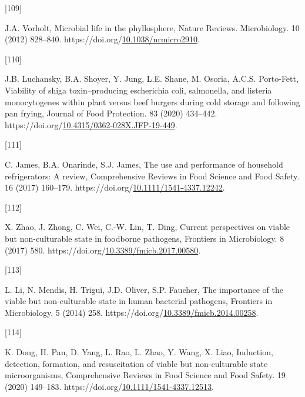 \documentclass[preprint,3p,
a4paper]{elsarticle} %
\newlength{\cslhangindent}
\newlength{\csllabelwidth}
\newlength{\cslentryspacingunit} %
\newenvironment{CSLReferences}[2] %
 {%
  \setlength{\parindent}{0pt}
  \ifodd #1
  \let\oldpar\par
  \def\par{\hangindent=\cslhangindent\oldpar}
  \fi
  \setlength{\parskip}{#2\cslentryspacingunit}
 }%
 {}
\newcommand{\CSLLeftMargin}[1]{\parbox[t]{\csllabelwidth}{#1}}
\newcommand{\CSLRightInline}[1]{\parbox[t]{\linewidth - \csllabelwidth}{#1}\break}
\begin{document}
\begin{CSLReferences}{0}{0}
\leavevmode{}%
\CSLLeftMargin{{[}109{]} }%
\CSLRightInline{J.A. Vorholt, Microbial life in the phyllosphere, Nature
Reviews. Microbiology. 10 (2012) 828--840.
https://doi.org/\href{https://doi.org/10.1038/nrmicro2910}{10.1038/nrmicro2910}.}

\leavevmode{}%
\CSLLeftMargin{{[}110{]} }%
\CSLRightInline{J.B. Luchansky, B.A. Shoyer, Y. Jung, L.E. Shane, M.
Osoria, A.C.S. Porto-Fett, Viability of shiga toxin--producing
escherichia coli, salmonella, and listeria monocytogenes within plant
versus beef burgers during cold storage and following pan frying,
Journal of Food Protection. 83 (2020) 434--442.
https://doi.org/\href{https://doi.org/10.4315/0362-028X.JFP-19-449}{10.4315/0362-028X.JFP-19-449}.}

\leavevmode{}%
\CSLLeftMargin{{[}111{]} }%
\CSLRightInline{C. James, B.A. Onarinde, S.J. James, The use and
performance of household refrigerators: A review, Comprehensive Reviews
in Food Science and Food Safety. 16 (2017) 160--179.
https://doi.org/\href{https://doi.org/10.1111/1541-4337.12242}{10.1111/1541-4337.12242}.}

\leavevmode{}%
\CSLLeftMargin{{[}112{]} }%
\CSLRightInline{X. Zhao, J. Zhong, C. Wei, C.-W. Lin, T. Ding, Current
perspectives on viable but non-culturable state in foodborne pathogens,
Frontiers in Microbiology. 8 (2017) 580.
https://doi.org/\href{https://doi.org/10.3389/fmicb.2017.00580}{10.3389/fmicb.2017.00580}.}

\leavevmode{}%
\CSLLeftMargin{{[}113{]} }%
\CSLRightInline{L. Li, N. Mendis, H. Trigui, J.D. Oliver, S.P. Faucher,
The importance of the viable but non-culturable state in human bacterial
pathogens, Frontiers in Microbiology. 5 (2014) 258.
https://doi.org/\href{https://doi.org/10.3389/fmicb.2014.00258}{10.3389/fmicb.2014.00258}.}

\leavevmode{}%
\CSLLeftMargin{{[}114{]} }%
\CSLRightInline{K. Dong, H. Pan, D. Yang, L. Rao, L. Zhao, Y. Wang, X.
Liao, Induction, detection, formation, and resuscitation of viable but
non-culturable state microorganisms, Comprehensive Reviews in Food
Science and Food Safety. 19 (2020) 149--183.
https://doi.org/\href{https://doi.org/10.1111/1541-4337.12513}{10.1111/1541-4337.12513}.}

\end{CSLReferences}
\end{document}
